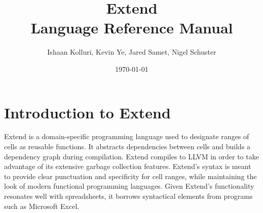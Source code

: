 \documentclass[titlepage]{article}
\title{Extend\\ Language Reference Manual}
\author{Ishaan Kolluri, Kevin Ye, Jared Samet, Nigel Schuster}
\date{\today}
\begin{document}
\maketitle
\tableofcontents
\section{Introduction to Extend}
	Extend is a domain-specific programming language used to designate ranges of cells as reusable functions. It abstracts dependencies between cells and builds a dependency graph during compilation. Extend compiles to LLVM in order to take advantage of its extensive garbage collection features.
	\newline
	Extend's syntax is meant to provide clear punctuation and specificity for cell ranges, while maintaining the look of modern functional programming languages. Given Extend's functionality resonates well with spreadsheets, it borrows syntactical elements from programs such as Microsoft Excel.
\end{document}
